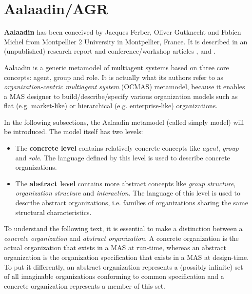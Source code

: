 \section{Aalaadin/AGR}

\textbf{Aalaadin} has been conceived by Jacques Ferber, Oliver Gutknecht and Fabien Michel from Montpellier 2 University in Montpellier, France.
It is described in an (unpublished) research report \cite{Ferber97} and conference/workshop articles \cite{Ferber98}, \cite{Ferber00} and \cite{Ferber03}.

Aalaadin is a generic metamodel of multiagent systems based on three core concepts: agent, group and role.
It is actually what its authors refer to as \textit{organization-centric multiagent system} (OCMAS) metamodel, because it enables a MAS designer to build/describe/specify various organization models such as flat (e.g. market-like) or hierarchical (e.g. enterprise-like) organizations.

In the following subsections, the Aalaadin metamodel (called simply model) will be introduced.
The model itself has two levels:
\begin{itemize}
	\item The \textbf{concrete level} contains relatively concrete concepts like \textit{agent}, \textit{group} and \textit{role}.
	The language defined by this level is used to describe concrete organizations.
	\item The \textbf{abstract level} contains more abstract concepts like \textit{group structure}, \textit{organization structure} and \textit{interaction}. 
	The language of this level is used to describe abstract organizations, i.e. families of organizations sharing the same structural characteristics.
\end{itemize}

To understand the following text, it is essential to make a distinction between a \textit{concrete organization} and \textit{abstract organization}.
A concrete organization is the actual organization that exists in a MAS at run-time, whereas an abstract organization is the organization specification that exists in a MAS at design-time.
To put it differently, an abstract organization represents a (possibly infinite) set of all imaginable organizations conforming to common specification and a concrete organization represents a member of this set.

